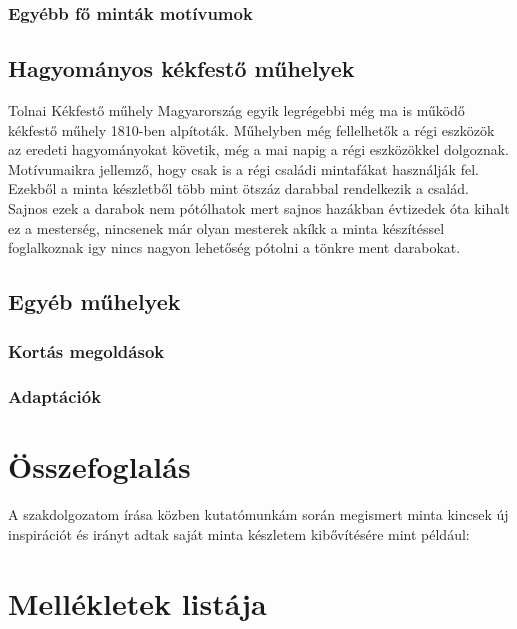 \documentclass[fontsize=12pt, appendixprefix=true]{scrreprt}
\begin{document}
\subsection{Egyébb fő minták motívumok}
\section{Hagyományos kékfestő műhelyek}
Tolnai Kékfestő műhely Magyarország  egyik legrégebbi még ma is működő kékfestő műhely 1810-ben alpítoták.
Műhelyben még fellelhetők a régi eszközök az eredeti hagyományokat követik, még a mai napig a régi eszközökkel dolgoznak.
Motívumaikra jellemző, hogy csak is a régi családi mintafákat használják fel.
Ezekből a minta készletből több mint ötszáz darabbal rendelkezik a család.
Sajnos ezek a darabok nem pótólhatok mert sajnos hazákban évtizedek óta kihalt ez a mesterség, nincsenek már olyan mesterek akíkk a minta készítéssel foglalkoznak igy nincs nagyon lehetőség pótolni a tönkre ment darabokat.
\section{Egyéb műhelyek}
\subsection{Kortás megoldások}
\subsection{Adaptációk}

\chapter{Összefoglalás} 
A szakdolgozatom írása közben kutatómunkám során megismert minta kincsek új inspirációt és irányt adtak saját minta készletem kibővítésére mint például: 

\printbibliography
\renewcommand{\appendixname}{Függelék}  %
\appendix
\chapter{Mellékletek listája}
\end{document}
